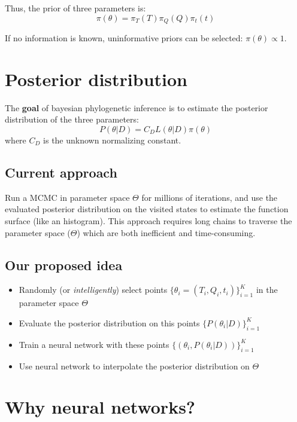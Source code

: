 \documentclass[]{article}
\providecommand{\tightlist}{%
  \setlength{\itemsep}{0pt}\setlength{\parskip}{0pt}}
\begin{document}
Thus, the prior of three parameters is: \[
\pi(\theta) = \pi_T(T) \pi_Q(Q) \pi_t(t)
\]

If no information is known, uninformative priors can be selected:
\(\pi(\theta) \propto 1\).

\hypertarget{posterior-distribution}{%
\section{Posterior distribution}\label{posterior-distribution}}

The \textbf{goal} of bayesian phylogenetic inference is to estimate the
posterior distribution of the three parameters: \[
P(\theta | D) = C_D L(\theta|D) \pi(\theta)
\] where \(C_D\) is the unknown normalizing constant.

\hypertarget{current-approach}{%
\subsection{Current approach}\label{current-approach}}

Run a MCMC in parameter space \(\Theta\) for millions of iterations, and
use the evaluated posterior distribution on the visited states to
estimate the function surface (like an histogram). This approach
requires long chains to traverse the parameter space (\(\Theta\)) which
are both inefficient and time-consuming.

\hypertarget{our-proposed-idea}{%
\subsection{Our proposed idea}\label{our-proposed-idea}}

\begin{itemize}
\tightlist
\item
  Randomly (or \emph{intelligently}) select points
  \(\{\theta_i = (T_i,Q_i,t_i)\}_{i=1}^K\) in the parameter space
  \(\Theta\)
\item
  Evaluate the posterior distribution on this points
  \(\{P(\theta_i|D)\}_{i=1}^K\)
\item
  Train a neural network with these points
  \(\{(\theta_i, P(\theta_i|D))\}_{i=1}^K\)
\item
  Use neural network to interpolate the posterior distribution on
  \(\Theta\)
\end{itemize}

\hypertarget{why-neural-networks}{%
\section{Why neural networks?}\label{why-neural-networks}}
\end{document}
